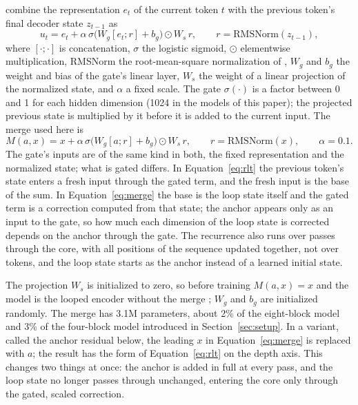 \documentclass[11pt]{article}
\begin{document}
\citet{zhang2026rlt} combine the representation $e_t$ of the current token $t$ with the previous token's final decoder state $z_{t-1}$ as
\begin{equation}
u_t = e_t + \alpha\, \sigma\big(W_g [e_t; r] + b_g\big) \odot W_s\, r, \qquad r = \mathrm{RMSNorm}(z_{t-1}),
\label{eq:rlt}
\end{equation}
where $[\cdot;\cdot]$ is concatenation, $\sigma$ the logistic sigmoid, $\odot$ elementwise multiplication, RMSNorm the root-mean-square
normalization of \citet{zhang2019rmsnorm}, $W_g$ and $b_g$ the weight and bias of the gate's linear layer, $W_s$ the weight of a linear
projection of the normalized state, and $\alpha$ a fixed scale. The gate $\sigma(\cdot)$ is a factor between 0 and 1 for each hidden dimension
(1024 in the models of this paper); the projected previous state is multiplied by it before it is added to the current input. The merge used here is
\begin{equation}
M(a, x) = x + \alpha\, \sigma\big(W_g [a; r] + b_g\big) \odot W_s\, r, \qquad r = \mathrm{RMSNorm}(x), \qquad \alpha = 0.1.
\label{eq:merge}
\end{equation}
The gate's inputs are of the same kind in both, the fixed representation and the normalized state; what is gated differs. In
Equation~\eqref{eq:rlt} the previous token's state enters a fresh input through the gated term, and the fresh input is the base of the sum. In
Equation~\eqref{eq:merge} the base is the loop state itself and the gated term is a correction computed from that state; the anchor appears
only as an input to the gate, so how much each dimension of the loop state is corrected depends on the anchor through the gate. The recurrence
also runs over passes through the core, with all positions of the sequence updated together, not over tokens, and the loop state starts as the
anchor instead of a learned initial state.

The projection $W_s$ is initialized to zero, so before training $M(a, x) = x$ and the model is the looped encoder without the merge
\citep{bachlechner2021rezero}; $W_g$ and $b_g$ are initialized randomly. The merge has 3.1M parameters, about 2\% of the eight-block model and 3\% of the four-block model introduced in
Section~\ref{sec:setup}.
In a variant, called the anchor residual below, the leading $x$ in Equation~\eqref{eq:merge} is replaced with $a$; the result has the form of
Equation~\eqref{eq:rlt} on the depth axis. This changes two things at once: the anchor is added in full at every pass, and the loop state no
longer passes through unchanged, entering the core only through the gated, scaled correction.
\end{document}
